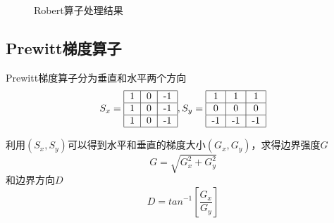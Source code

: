 \documentclass[UTF8]{ctexart}
\begin{document}
\begin{figure}[htbp]
\centering
{}
\caption{Robert算子处理结果}
\end{figure}

\subsection{Prewitt梯度算子}
Prewitt梯度算子分为垂直和水平两个方向
\[
S_x = 
\begin{tabular}{|c|c|c|}
\hline
1 & 0 & -1 \\
\hline
1 & 0 & -1 \\
\hline
1 & 0 & -1 \\
\hline
\end{tabular},
S_y = 
\begin{tabular}{|c|c|c|}
\hline
1 & 1 & 1 \\
\hline
0 & 0 & 0 \\
\hline
-1 & -1 & -1\\
\hline
\end{tabular}
\]

利用$(S_x,S_y)$可以得到水平和垂直的梯度大小$(G_x,G_y)$，求得边界强度$G$
\[
G = \sqrt{G_x^2 + G_y^2}
\]
和边界方向$D$
\[
D = tan^{-1}[\frac{G_x}{G_y}]
\]
\end{document}
